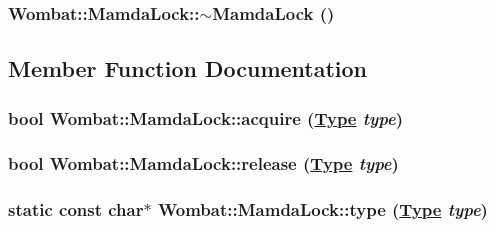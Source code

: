 \hypertarget{classWombat_1_1MamdaLock_c44daceadd98c555b2ee54cc695c84e3}{
\subsubsection[$\sim$MamdaLock]{\setlength{\rightskip}{0pt plus 5cm}Wombat::Mamda\-Lock::$\sim$Mamda\-Lock ()}}
\label{classWombat_1_1MamdaLock_c44daceadd98c555b2ee54cc695c84e3}




\subsection{Member Function Documentation}
\hypertarget{classWombat_1_1MamdaLock_246d89c8fc22d0eb3e539ce6a0dc4b2d}{
\subsubsection[acquire]{\setlength{\rightskip}{0pt plus 5cm}bool Wombat::Mamda\-Lock::acquire (\hyperlink{classWombat_1_1MamdaLock_93b6f826e707ab70c51dac7b99bce85b}{Type} {\em type})}}
\label{classWombat_1_1MamdaLock_246d89c8fc22d0eb3e539ce6a0dc4b2d}


\hypertarget{classWombat_1_1MamdaLock_c6eb40859055455de9f63b5aa6a47f23}{
\subsubsection[release]{\setlength{\rightskip}{0pt plus 5cm}bool Wombat::Mamda\-Lock::release (\hyperlink{classWombat_1_1MamdaLock_93b6f826e707ab70c51dac7b99bce85b}{Type} {\em type})}}
\label{classWombat_1_1MamdaLock_c6eb40859055455de9f63b5aa6a47f23}


\hypertarget{classWombat_1_1MamdaLock_bb8af28636c6a343cd9118e568f19068}{
\subsubsection[type]{\setlength{\rightskip}{0pt plus 5cm}static const char$\ast$ Wombat::Mamda\-Lock::type (\hyperlink{classWombat_1_1MamdaLock_93b6f826e707ab70c51dac7b99bce85b}{Type} {\em type})}}
\label{classWombat_1_1MamdaLock_bb8af28636c6a343cd9118e568f19068}


